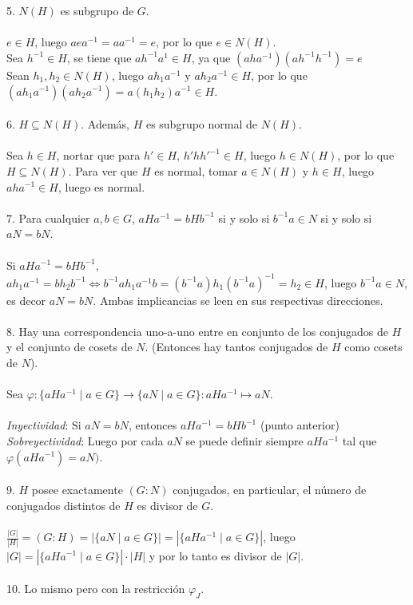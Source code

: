 \documentclass{article}
\begin{document}
\\
\\
5. $N(H)$ es subgrupo de $G$.
\\
\\
$e \in H$, luego $aea^{-1}=aa^{-1}=e$, por lo que $e \in N(H)$.
\\
Sea $h^{-1} \in H$, se tiene que $ah^{-1}a^{1} \in H$, ya que $(aha^{-1})(ah^{-1}h^{-1})=e$
\\
Sean $h_1,h_2 \in N(H)$, luego $ah_{1}a^{-1}$ y $ah_{2}a^{-1} \in H$, por lo que $(ah_1a^{-1})(ah_{2}a^{-1})=a(h_1h_2)a^{-1} \in H$.
\\
\\
6. $H \subseteq N(H)$. Además, $H$ es subgrupo normal de $N(H)$.
\\
\\
Sea $h \in H$, nortar que para $h' \in H$, $h'hh'^{-1} \in H$, luego $h \in N(H)$, por lo que $H \subseteq N(H)$. Para ver que $H$ es normal, tomar $a \in N(H)$ y $h \in H$, luego $aha^{-1} \in H$, luego es normal.
\\
\\
7. Para cualquier $a,b \in G$, $aHa^{-1}=bHb^{-1}$ si y solo si $b^{-1}a \in N$ si y solo si $aN=bN$.
\\
\\
Si $aHa^{-1}=bHb^{-1}$, $ah_{1}a^{-1}=bh_{2}b^{-1} \Longleftrightarrow b^{-1}ah_{1}a^{-1}b=(b^{-1}a)h_{1}(b^{-1}a)^{-1}=h_{2} \in H$, luego $b^{-1}a \in N$, es decor $aN=bN$. Ambas implicancias se leen en sus respectivas direcciones.
\\
\\
8. Hay una correspondencia uno-a-uno entre en conjunto de los conjugados de $H$ y el conjunto de cosets de $N$. (Entonces hay tantos conjugados de $H$ como cosets de $N$).
\\
\\
Sea $\varphi: \{aHa^{-1} \mid a \in G \} \to \{aN \mid a \in G \}: aHa^{-1} \mapsto aN$.
\\
\\
\textit{Inyectividad}: Si $aN=bN$, entonces $aHa^{-1}=bHb^{-1}$ (punto anterior)
\\
\textit{Sobreyectividad}: Luego por cada $aN$ se puede definir siempre $aHa^{-1}$ tal que $\varphi(aHa^{-1})=aN)$.
\\
\\
9. $H$ posee exactamente $(G:N)$ conjugados, en particular, el número de conjugados distintos de $H$ es divisor de $G$.
\\
\\
$\frac{|G|}{|H|}=(G:H)=|\{aN \mid a \in G\}|=|\{aHa^{-1} \mid a \in G \}|$, luego $|G|=|\{aHa^{-1} \mid a \in G \}|\cdot |H|$ y por lo tanto es divisor de $|G|$.
\\
\\
10. Lo mismo pero con la restricción $\varphi_{J}$.
\end{document}
